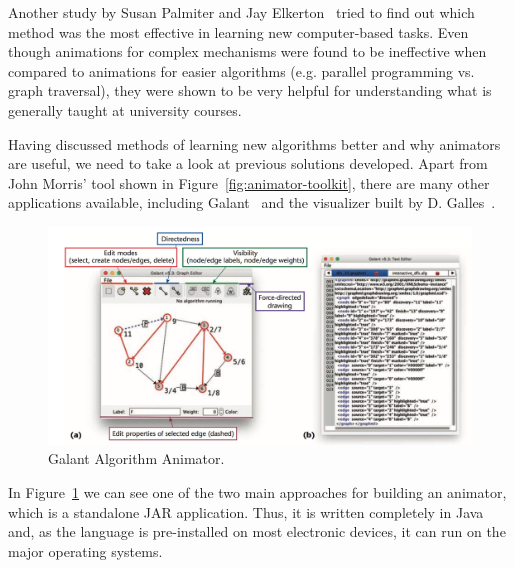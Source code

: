\documentclass{l4proj}
\begin{document}
Another study by Susan Palmiter and Jay Elkerton~\cite{palmiter-elkerton} tried to find out which method was the most
effective in learning new computer-based tasks. Even though animations for complex mechanisms were found to be
ineffective when compared to animations for easier algorithms (e.g. parallel programming vs. graph traversal), they were shown to be very helpful
for understanding what is generally taught at university courses.

Having discussed methods of learning new algorithms better and why animators are useful, we need to take a look at
previous solutions developed. Apart from John Morris' tool shown in Figure~\ref{fig:animator-toolkit}, there are many other applications available, including Galant~\cite{galant} and the visualizer built by D. Galles~\cite{galles}.
\pagebreak

\begin{figure}[!ht]
\centering
\includegraphics[scale=0.4]{galant}
\caption{Galant Algorithm Animator.}
\label{fig:galant}
\end{figure}

In Figure~\ref{fig:galant} we can see one of the two main approaches for building an animator, which is a standalone JAR application. Thus, it is written completely in Java and, as the language is pre-installed on most electronic devices, it can run on the major operating systems.
\end{document}
